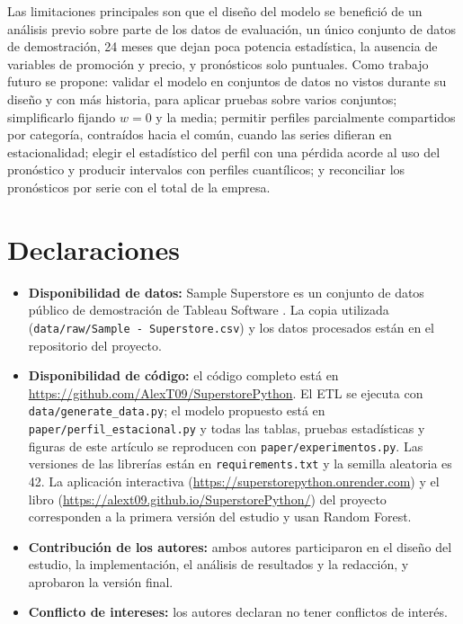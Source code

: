 \documentclass[pdflatex,sn-mathphys-num]{sn-jnl}
\begin{document}
Las limitaciones principales son que el diseño del modelo se benefició de un análisis previo sobre parte de los datos de evaluación, un único conjunto de datos de demostración, 24 meses que dejan poca potencia estadística, la ausencia de variables de promoción y precio, y pronósticos solo puntuales. Como trabajo futuro se propone: validar el modelo en conjuntos de datos no vistos durante su diseño y con más historia, para aplicar pruebas sobre varios conjuntos; simplificarlo fijando $w=0$ y la media; permitir perfiles parcialmente compartidos por categoría, contraídos hacia el común, cuando las series difieran en estacionalidad; elegir el estadístico del perfil con una pérdida acorde al uso del pronóstico y producir intervalos con perfiles cuantílicos; y reconciliar los pronósticos por serie con el total de la empresa.

\backmatter

\section*{Declaraciones}

\begin{itemize}
\item \textbf{Disponibilidad de datos:} Sample Superstore es un conjunto de datos público de demostración de Tableau Software \cite{superstore}. La copia utilizada (\texttt{data/raw/Sample - Superstore.csv}) y los datos procesados están en el repositorio del proyecto.
\item \textbf{Disponibilidad de código:} el código completo está en \url{https://github.com/AlexT09/SuperstorePython}. El ETL se ejecuta con \texttt{data/generate\_data.py}; el modelo propuesto está en \texttt{paper/perfil\_estacional.py} y todas las tablas, pruebas estadísticas y figuras de este artículo se reproducen con \texttt{paper/experimentos.py}. Las versiones de las librerías están en \texttt{requirements.txt} y la semilla aleatoria es 42. La aplicación interactiva (\url{https://superstorepython.onrender.com}) y el libro (\url{https://alext09.github.io/SuperstorePython/}) del proyecto corresponden a la primera versión del estudio y usan Random Forest.
\item \textbf{Contribución de los autores:} ambos autores participaron en el diseño del estudio, la implementación, el análisis de resultados y la redacción, y aprobaron la versión final.
\item \textbf{Conflicto de intereses:} los autores declaran no tener conflictos de interés.
\end{itemize}


\end{document}
